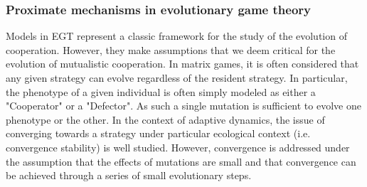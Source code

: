
        \subsubsection{Proximate mechanisms in evolutionary game theory}

            Models in EGT represent a classic framework for the study of the evolution of cooperation. However, they make assumptions that we deem critical for the evolution of mutualistic cooperation. In matrix games, it is often considered that any given strategy can evolve regardless of the resident strategy. In particular, the phenotype of a given individual is often simply modeled as either a "Cooperator" or a "Defector". As such a single mutation is sufficient to evolve one phenotype or the other. In the context of adaptive dynamics, the issue of converging towards a strategy under particular ecological context (i.e. convergence stability) is well studied. However, convergence is addressed under the assumption that the effects of mutations are small and that convergence can be achieved through a series of small evolutionary steps.

